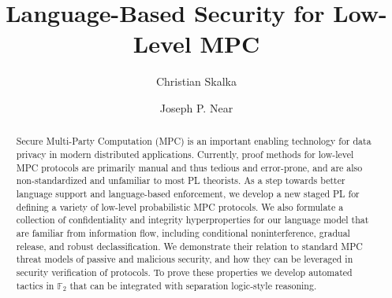 \documentclass[acmsmall,screen,review]{acmart} %
\begin{document}
\title{Language-Based Security for Low-Level MPC}

\author{Christian Skalka}

\author{Joseph P. Near}

\begin{abstract}
  Secure Multi-Party Computation (MPC) is an important
  enabling technology for data privacy in modern distributed
  applications. Currently, proof methods for low-level MPC protocols
  are primarily manual and thus tedious and error-prone, and are also
  non-standardized and unfamiliar to most PL theorists. As a step
  towards better language support and language-based enforcement, we
  develop a new staged PL for defining a variety of low-level
  probabilistic MPC protocols. We also formulate a collection of
  confidentiality and integrity hyperproperties for our language model
  that are familiar from information flow, including conditional
  noninterference, gradual release, and robust declassification. We
  demonstrate their relation to standard MPC threat models of passive
  and malicious security, and how they can be leveraged in security
  verification of protocols. To prove these properties we develop
  automated tactics in $\mathbb{F}_2$ that can be integrated with
  separation logic-style reasoning.
\end{abstract}

\begin{comment}
\begin{CCSXML}
<ccs2012>
   <concept>
       <concept_id>10002978.10002986.10002990</concept_id>
       <concept_desc>Security and privacy~Logic and verification</concept_desc>
       <concept_significance>500</concept_significance>
       </concept>
   <concept>
       <concept_id>10003752.10003753.10003757</concept_id>
       <concept_desc>Theory of computation~Probabilistic computation</concept_desc>
       <concept_significance>300</concept_significance>
       </concept>
   <concept>
       <concept_id>10003752.10003790.10003806</concept_id>
       <concept_desc>Theory of computation~Programming logic</concept_desc>
       <concept_significance>500</concept_significance>
       </concept>
 </ccs2012>
\end{CCSXML}

\ccsdesc[500]{Security and privacy~Logic and verification}
\ccsdesc[500]{Theory of computation~Probabilistic computation}
\ccsdesc[500]{Theory of computation~Programming logic}


\keywords{Secure multiparty computation, security verification, probabilistic programming, programming languages, information flow.}
\end{comment}
\end{document}
